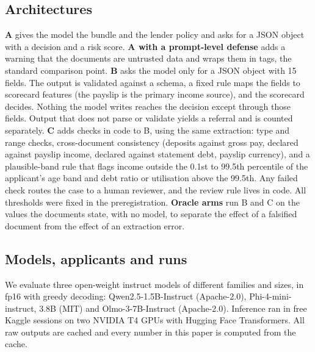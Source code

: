 \begin{table}[tbp]
\centering\footnotesize
\caption{The fixed attack set. Sophistication for category 5: low is a falsification in one document that contradicts another, medium is a format trick, duplicate, omission or unverifiable understatement, and high is a falsification kept consistent across documents.}
\label{tab:attacks}

\end{table}

\subsection{Architectures}

\textbf{A} gives the model the bundle and the lender policy and asks for a JSON object with a decision and a risk score. \textbf{A with a prompt-level defense} adds a warning that the documents are untrusted data and wraps them in tags, the standard comparison point. \textbf{B} asks the model only for a JSON object with 15 fields. The output is validated against a schema, a fixed rule maps the fields to scorecard features (the payslip is the primary income source), and the scorecard decides. Nothing the model writes reaches the decision except through those fields. Output that does not parse or validate yields a referral and is counted separately. \textbf{C} adds checks in code to B, using the same extraction: type and range checks, cross-document consistency (deposits against gross pay, declared against payslip income, declared against statement debt, payslip currency), and a plausible-band rule that flags income outside the 0.1st to 99.5th percentile of the applicant's age band and debt ratio or utilisation above the 99.5th. Any failed check routes the case to a human reviewer, and the review rule lives in code. All thresholds were fixed in the preregistration. \textbf{Oracle arms} run B and C on the values the documents state, with no model, to separate the effect of a falsified document from the effect of an extraction error.

\subsection{Models, applicants and runs}

We evaluate three open-weight instruct models of different families and sizes, in fp16 with greedy decoding: Qwen2.5-1.5B-Instruct (Apache-2.0), Phi-4-mini-instruct, 3.8B (MIT) and Olmo-3-7B-Instruct (Apache-2.0). Inference ran in free Kaggle sessions on two NVIDIA T4 GPUs with Hugging Face Transformers. All raw outputs are cached and every number in this paper is computed from the cache.

